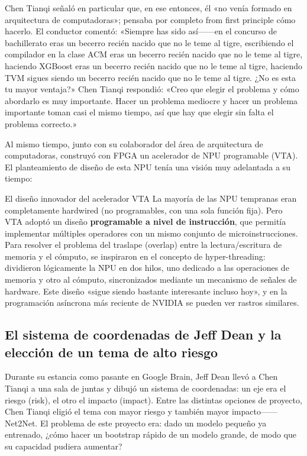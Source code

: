 \documentclass[a4paper]{article}
\begin{document}
Chen Tianqi señaló en particular que, en ese entonces, él «no venía formado en arquitectura de computadoras»; pensaba por completo from first principle cómo hacerlo. El conductor comentó: «Siempre has sido así------en el concurso de bachillerato eras un becerro recién nacido que no le teme al tigre, escribiendo el compilador en la clase ACM eras un becerro recién nacido que no le teme al tigre, haciendo XGBoost eras un becerro recién nacido que no le teme al tigre, haciendo TVM sigues siendo un becerro recién nacido que no le teme al tigre. ¿No es esta tu mayor ventaja?» Chen Tianqi respondió: «Creo que elegir el problema y cómo abordarlo es muy importante. Hacer un problema mediocre y hacer un problema importante toman casi el mismo tiempo, así que hay que elegir sin falta el problema correcto.»

Al mismo tiempo, junto con su colaborador del área de arquitectura de computadoras, construyó con FPGA un acelerador de NPU programable (VTA). El planteamiento de diseño de esta NPU tenía una visión muy adelantada a su tiempo:

\begin{knowledgebox}{El diseño innovador del acelerador VTA}
La mayoría de las NPU tempranas eran completamente hardwired (no programables, con una sola función fija). Pero VTA adoptó un diseño \textbf{programable a nivel de instrucción}, que permitía implementar múltiples operadores con un mismo conjunto de microinstrucciones. Para resolver el problema del traslape (overlap) entre la lectura/escritura de memoria y el cómputo, se inspiraron en el concepto de hyper-threading: dividieron lógicamente la NPU en dos hilos, uno dedicado a las operaciones de memoria y otro al cómputo, sincronizados mediante un mecanismo de señales de hardware. Este diseño «sigue siendo bastante interesante incluso hoy», y en la programación asíncrona más reciente de NVIDIA se pueden ver rastros similares.
\end{knowledgebox}

\subsection{El sistema de coordenadas de Jeff Dean y la elección de un tema de alto riesgo}

Durante su estancia como pasante en Google Brain, Jeff Dean llevó a Chen Tianqi a una sala de juntas y dibujó un sistema de coordenadas: un eje era el riesgo (risk), el otro el impacto (impact). Entre las distintas opciones de proyecto, Chen Tianqi eligió el tema con mayor riesgo y también mayor impacto------Net2Net. El problema de este proyecto era: dado un modelo pequeño ya entrenado, ¿cómo hacer un bootstrap rápido de un modelo grande, de modo que su capacidad pudiera aumentar?
\end{document}
